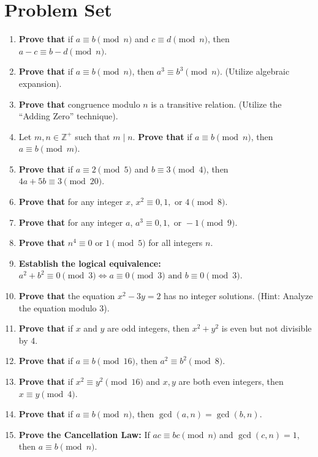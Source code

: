 \documentclass{article}
\begin{document}
\newpage

\section{Problem Set}
\label{sec:problems}

\begin{enumerate}
    \item \textbf{Prove that} if $a \equiv b \pmod n$ and $c \equiv d \pmod n$, then $a - c \equiv b - d \pmod n$.
    \item \textbf{Prove that} if $a \equiv b \pmod n$, then $a^3 \equiv b^3 \pmod n$. (Utilize algebraic expansion).
    \item \textbf{Prove that} congruence modulo $n$ is a transitive relation. (Utilize the ``Adding Zero'' technique).
    \item Let $m, n \in \mathbb{Z}^+$ such that $m \mid n$. \textbf{Prove that} if $a \equiv b \pmod n$, then $a \equiv b \pmod m$.
    \item \textbf{Prove that} if $a \equiv 2 \pmod 5$ and $b \equiv 3 \pmod 4$, then $4a + 5b \equiv 3 \pmod{20}$.
    \item \textbf{Prove that} for any integer $x$, $x^2 \equiv 0, 1, \text{ or } 4 \pmod 8$.
    \item \textbf{Prove that} for any integer $a$, $a^3 \equiv 0, 1, \text{ or } -1 \pmod 9$.
    \item \textbf{Prove that} $n^4 \equiv 0 \text{ or } 1 \pmod 5$ for all integers $n$.
    \item \textbf{Establish the logical equivalence:} $a^2 + b^2 \equiv 0 \pmod 3 \iff a \equiv 0 \pmod 3 \text{ and } b \equiv 0 \pmod 3$.
    \item \textbf{Prove that} the equation $x^2 - 3y = 2$ has no integer solutions. (Hint: Analyze the equation modulo 3).
    \item \textbf{Prove that} if $x$ and $y$ are odd integers, then $x^2 + y^2$ is even but not divisible by 4.
    \item \textbf{Prove that} if $a \equiv b \pmod{16}$, then $a^2 \equiv b^2 \pmod 8$.
    \item \textbf{Prove that} if $x^2 \equiv y^2 \pmod{16}$ and $x, y$ are both even integers, then $x \equiv y \pmod 4$.
    \item \textbf{Prove that} if $a \equiv b \pmod n$, then $\gcd(a, n) = \gcd(b, n)$.
    \item \textbf{Prove the Cancellation Law:} If $ac \equiv bc \pmod n$ and $\gcd(c, n) = 1$, then $a \equiv b \pmod n$.

\end{enumerate}
\end{document}
